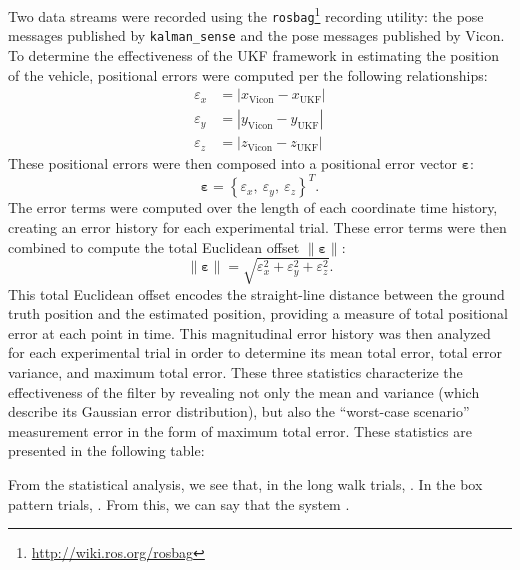 Two data streams were recorded using the \texttt{rosbag}\footnote{\url{http://wiki.ros.org/rosbag}} recording utility: the pose messages published by \texttt{kalman\_sense} and the pose messages published by Vicon. To determine the effectiveness of the UKF framework in estimating the position of the vehicle, positional errors were computed per the following relationships:
%
\begin{align}
\varepsilon_{x} &= | x_{\text{Vicon}} - x_{\text{UKF}} | \\
\varepsilon_{y} &= | y_{\text{Vicon}} - y_{\text{UKF}} | \\
\varepsilon_{z} &= | z_{\text{Vicon}} - z_{\text{UKF}} |
\end{align}
%
These positional errors were then composed into a positional error vector $\bm{\varepsilon}$:
%
\begin{equation}
\bm{\varepsilon} = \left\lbrace \varepsilon_{x},\ \varepsilon_{y},\ \varepsilon_{z} \right\rbrace ^{T} .
\end{equation}
%
The error terms were computed over the length of each coordinate time history, creating an error history for each experimental trial. These error terms were then combined to compute the total Euclidean offset $\| \bm{\varepsilon} \|$:
%
\begin{equation}
\| \bm{\varepsilon} \| = \sqrt{\varepsilon_{x}^{2} + \varepsilon_{y}^{2} + \varepsilon_{z}^{2}} . 
\end{equation}
%
This total Euclidean offset encodes the straight-line distance between the ground truth position and the estimated position, providing a measure of total positional error at each point in time. This magnitudinal error history was then analyzed for each experimental trial in order to determine its mean total error, total error variance, and maximum total error. These three statistics characterize the effectiveness of the filter by revealing not only the mean and variance (which describe its Gaussian error distribution), but also the ``worst-case scenario'' measurement error in the form of maximum total error. These statistics are presented in the following table:


From the statistical analysis, we see that, in the long walk trials, . In the box pattern trials, . From this, we can say that the system .

